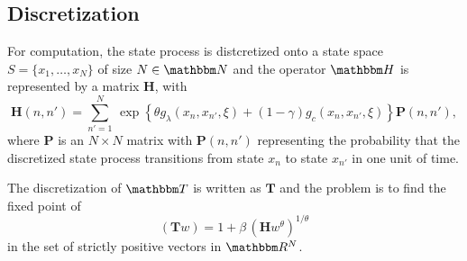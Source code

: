 \documentclass[12pt, reqno]{amsart}
\newcommand{\1}{\mathbbm 1}
\newcommand{\RR}{\mathbbm R}
\newcommand{\NN}{\mathbbm N}
\newcommand{\TT}{\mathbbm T}
\newcommand{\HH}{\mathbbm H}
\newcommand{\bH}{\mathbf H}
\newcommand{\bT}{\mathbf T}
\newcommand{\bP}{\mathbf P}
\theoremstyle{plain}
\theoremstyle{definition}
\begin{document}
\subsection{Discretization}

For computation, the state process is distcretized onto a state space $S =
\{x_1, \ldots, x_N\}$ of size $N \in \NN$ and the operator $\HH$ is
represented by a matrix $\bH$, with 
%
\begin{equation}\label{eq:defkb}
    \bH(n, n') = \sum_{n'=1}^N 
        \,
        \exp
        \left\{ 
            \theta g_\lambda(x_n, x_{n'}, \xi) 
            + (1-\gamma) g_c(x_n, x_{n'}, \xi)
        \right\}
    \bP(n, n'),
\end{equation}
%
where $\bP$ is an $N \times N$ matrix with  $\bP(n, n')$ representing the
probability that the discretized state process transitions from state $x_n$ to
state $x_{n'}$ in one unit of time.

The discretization of $\TT$ is written as $\bT$ and the problem is to find the
fixed point of 
%
\begin{equation}\label{eq:wcopd}
    (\bT w) = 1 + \beta \,  (\bH w^\theta)^{1/\theta}
\end{equation}
%
in the set of strictly positive vectors in $\RR^N$.








\end{document}
